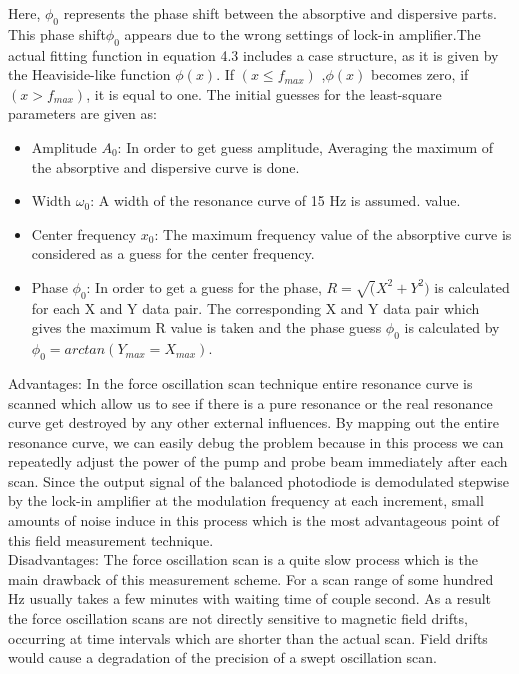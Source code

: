 \documentclass[12pt]{report}
\begin{document}
Here, $\phi_{0} $ represents the phase shift between the absorptive and dispersive parts. This phase shift$\phi_{0}$ appears due to the wrong settings of lock-in amplifier.The actual fitting function in equation 4.3 includes a case
structure, as it is given by the Heaviside-like function $\phi(x)$. If $ (x \leq f_{max}) $ ,$\phi(x)$ becomes zero,
if $(x > f_{max})$, it is equal to one. The initial guesses for the least-square parameters are given
as:\\
\begin{itemize}
\item
Amplitude $A_0$: In order to get guess amplitude, Averaging the maximum of the absorptive and dispersive curve is done.
\item
Width $\omega_0$: A width of the resonance curve of 15 Hz is assumed.
value.
\item
Center frequency $x_0$: The maximum frequency value of the
absorptive curve is considered as a guess for the center frequency.
\item
Phase $\phi_0$: In order to get a guess for the phase, $ R =\sqrt (
X^2 + Y ^2)$ is calculated for each
X and Y data pair. The corresponding X and Y data pair which gives the maximum
R value is taken and the phase guess $\phi _0$  is calculated by $\phi _0 = arctan(Y_{max}=X_{max})$.
\end{itemize}
Advantages: In the force oscillation scan technique entire resonance curve is scanned which allow us to see if there is a pure resonance or the real resonance curve get destroyed by any other external influences. By mapping out the entire resonance curve, we can easily debug the problem because in this process we can repeatedly adjust the power of the pump and probe beam immediately after each scan. Since the output signal of the balanced photodiode is demodulated stepwise by the lock-in amplifier at the modulation frequency at each increment, small amounts of noise induce in this process which is the most advantageous point of this field measurement technique. \\
Disadvantages: The force oscillation scan is a quite slow process which is the main drawback of this measurement scheme.
For a scan range of some hundred Hz usually takes a few minutes with  waiting time of couple second. As a result the force oscillation scans are not directly sensitive to magnetic field drifts, occurring at time intervals which are shorter than the actual scan. Field drifts would cause a degradation of the precision of a swept oscillation scan.
\end{document}
